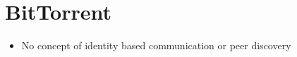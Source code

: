 \hypertarget{bittorrent}{%
\section{BitTorrent}\label{bittorrent}}

\begin{itemize}
\tightlist
\item
  No concept of identity based communication or peer discovery
\end{itemize}
